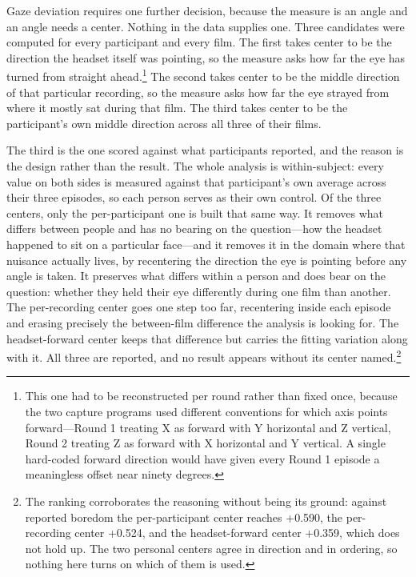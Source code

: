 Gaze deviation requires one further decision, because the measure is an angle and an angle needs
a center. Nothing in the data supplies one. Three candidates were computed for every
participant and every film. The first takes center to be the direction the headset itself was
pointing, so the measure asks how far the eye has turned from straight ahead.\footnote{This one
had to be reconstructed per round rather than fixed once, because the two capture programs used
different conventions for which axis points forward---Round 1 treating X as forward with Y
horizontal and Z vertical, Round 2 treating Z as forward with X horizontal and Y vertical.
A single hard-coded forward direction
would have given every Round 1 episode a meaningless offset near ninety degrees.} The second
takes center to be the middle direction of that particular recording, so the measure asks how
far the eye strayed from where it mostly sat during that film. The third takes center to be the
participant's own middle direction across all three of their films.

The third is the one scored against what participants reported, and the reason is the design
rather than the result. The whole analysis is within-subject: every value on both sides is
measured against that participant's own average across their three episodes, so each person
serves as their own control. Of the three centers, only the per-participant one is built that
same way. It removes what differs between people and has no bearing on the question---how the
headset happened to sit on a particular face---and it removes it in the domain where that
nuisance actually lives, by recentering the direction the eye is pointing before any angle is
taken. It preserves what differs within a person and does bear on the question: whether they
held their eye differently during one film than another. The per-recording center goes one step
too far, recentering inside each episode and erasing precisely the between-film difference the
analysis is looking for. The headset-forward center keeps that difference but carries the
fitting variation along with it. All three are reported, and no result appears without its
center named.\footnote{The ranking corroborates the reasoning without being its ground: against
reported boredom the per-participant center reaches +0.590, the per-recording center +0.524,
and the headset-forward center +0.359, which does not hold up. The two personal centers agree
in direction and in ordering, so nothing here turns on which of them is used.}


